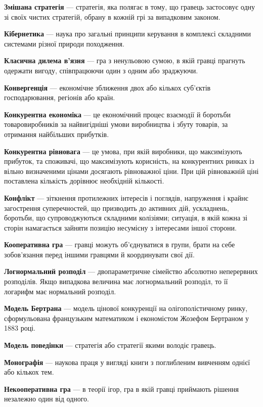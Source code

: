 \documentclass[a4paper]{article}
\begin{document}
\textbf{Змішана стратегія} — стратегія, яка полягає в тому, що гравець застосовує одну зі своїх чистих стратегій, обрану в кожній грі за випадковим законом.

\textbf{Кібернетика} — наука про загальні принципи керування в комплексі складними системами різної природи походження.

\textbf{Класична дилема в’язня} — гра з ненульовою сумою, в якій гравці прагнуть одержати вигоду, співпрацюючи один з одним або зраджуючи.

\textbf{Конвергенція} — економічне зближення двох або кількох суб'єктів господарювання, регіонів або країн.

\textbf{Конкурентна економіка} — це економічний процес взаємодії й боротьби товаровиробників за найвигідніші умови виробництва і збуту товарів, за отримання найбільших прибутків.

\textbf{Конкурентна рівновага} — це умова, при якій виробники, що максимізують прибуток, та споживачі, що максимізують корисність, на конкурентних ринках із вільно визначеними цінами досягають рівноважної ціни. При цій рівноважній ціні поставлена кількість дорівнює необхідній кількості.

\textbf{Конфлікт} — зіткнення протилежних інтересів і поглядів, напруження і крайнє загострення суперечностей, що призводить до активних дій, ускладнень, боротьби, що супроводжуються складними колізіями; ситуація, в якій кожна зі сторін намагається зайняти позицію несумісну з інтересами іншої сторони.

\textbf{Кооперативна гра} — гравці можуть об'єднуватися в групи, брати на себе зобов'язання перед іншими гравцями й координувати свої дії.

\textbf{Логнормальний розподіл} — двопараметричне сімейство абсолютно неперервних розподілів. Якщо випадкова величина має логнормальний розподіл, то її логарифм має нормальний розподіл.

\textbf{Модель Бертрана} — модель цінової конкуренції на олігополістичному ринку, сформульована французьким математиком і економістом Жозефом Бертраном у 1883 році.

\textbf{Модель поведінки} — стратегія або стратегії якими володіє гравець.

\textbf{Монографія} — наукова праця у вигляді книги з поглибленим вивченням однієї або кількох тем.

\textbf{Некооперативна гра} — в теорії ігор, гра в якій гравці приймають рішення незалежно один від одного.
\end{document}
